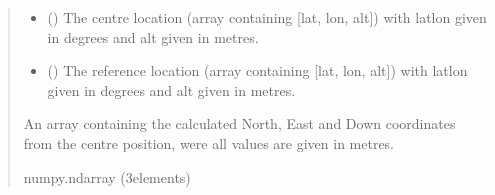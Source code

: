 \documentclass[letterpaper,10pt,english]{sphinxmanual}
\begin{document}
\begin{fulllineitems}
\begin{quote}\begin{description}
\begin{itemize}
\item {} 
\sphinxAtStartPar
{} (\sphinxstyleliteralemphasis{\sphinxupquote{ (}}\sphinxstyleliteralemphasis{\sphinxupquote{)}}) \textendash{} The centre location (array containing {[}lat, lon, alt{]}) with
lat\sphinxhyphen{}lon given in degrees and alt given in metres.

\item {} 
\sphinxAtStartPar
{} (\sphinxstyleliteralemphasis{\sphinxupquote{ (}}\sphinxstyleliteralemphasis{\sphinxupquote{)}}) \textendash{} The reference location (array containing {[}lat, lon, alt{]})
with lat\sphinxhyphen{}lon given in degrees and alt given in metres.

\end{itemize}

\sphinxAtStartPar
An array containing the calculated North, East and Down
coordinates from the centre position, were all values are given in
metres.

\sphinxAtStartPar
numpy.ndarray (3\sphinxhyphen{}elements)

\end{description}\end{quote}

\end{fulllineitems}

\end{document}

